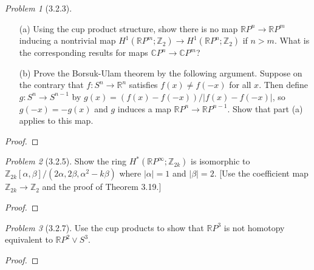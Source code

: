 \documentclass[10pt]{article}
\newcommand{\sk}{\vskip 10mm}
\newcommand{\bb}[1]{\mathbb{#1}}
\theoremstyle{remark}
\newtheorem{problem}{Problem}
\begin{document}
\begin{problem}[3.2.3]
  \begin{enumerate}
  \item[(a)] Using the cup product structure, show there is no map
    $\bb{R}P^n\rightarrow\bb{R}P^m$ inducing a nontrivial map
    $H^1(\bb{R}P^m;\bb{Z}_2)\rightarrow H^1(\bb{R}P^n;\bb{Z}_2)$ if $n>m$. What
    is the corresponding results for maps $\bb{C}P^n\rightarrow\bb{C}P^m$?
  \item[(b)] Prove the Borsuk-Ulam theorem by the following argument. Suppose on
    the contrary that $f:S^n\rightarrow \bb{R}^n$ satisfies $f(x)\neq f(-x)$ for
    all $x$. Then define $g:S^n\rightarrow S^{n-1}$ by
    $g(x)=(f(x)-f(-x))/|f(x)-f(-x)|$, so $g(-x)=-g(x)$
    and $g$ induces a map $\bb{R}P^n\rightarrow\bb{R}P^{n-1}$. Show that
    part (a) applies to this map.
  \end{enumerate}
\end{problem}

\begin{proof}
  
\end{proof}

\sk

\begin{problem}[3.2.5]
  Show the ring $H^*(\bb{R}P^\infty;\bb{Z}_{2k})$ is isomorphic to
  $\bb{Z}_{2k}[\alpha,\beta]/(2\alpha,2\beta,\alpha^2-k\beta)$ where
  $|\alpha|=1$ and $|\beta|=2$. [Use the coefficient map
  $\bb{Z}_{2k}\rightarrow\bb{Z}_2$ and the proof of Theorem 3.19.]
\end{problem}

\begin{proof}
  
\end{proof}

\sk

\begin{problem}[3.2.7]
  Use the cup products to show that $\bb{R}P^3$ is  not homotopy equivalent to
  $\bb{R}P^2\vee S^3$.
\end{problem}

\begin{proof}
  
\end{proof}
\end{document}
